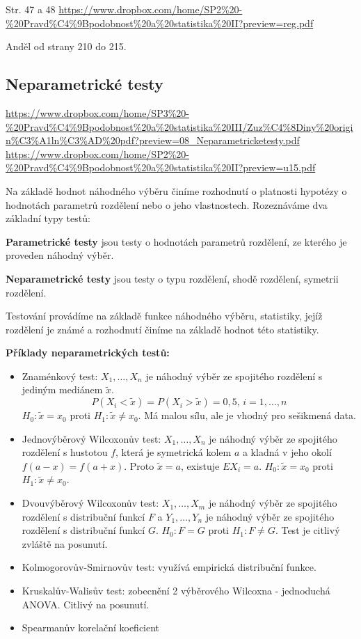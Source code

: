 \documentclass[a4]{report}
\theoremstyle{definition}
\begin{document}
{Str. 47 a 48
\url{https://www.dropbox.com/home/SP2\%20-\%20Pravd\%C4\%9Bpodobnost\%20a\%20statistika\%20II?preview=reg.pdf}

Anděl od strany 210 do 215. 

\subsection{Neparametrické testy}
\url{https://www.dropbox.com/home/SP3\%20-\%20Pravd\%C4\%9Bpodobnost\%20a\%20statistika\%20III/Zuz\%C4\%8Diny\%20origin\%C3\%A1ln\%C3\%AD\%20pdf?preview=08_Neparametricketesty.pdf}
\url{https://www.dropbox.com/home/SP2\%20-\%20Pravd\%C4\%9Bpodobnost\%20a\%20statistika\%20II?preview=u15.pdf}

Na základě hodnot náhodného výběru činíme rozhodnutí o platnosti hypotézy o hodnotách parametrů rozdělení nebo o jeho vlastnostech. Rozeznáváme dva základní typy testů:

\textbf{Parametrické testy} jsou testy o hodnotách parametrů rozdělení, ze kterého je proveden náhodný výběr.

\textbf{Neparametrické testy} jsou testy o typu rozdělení, shodě rozdělení, symetrii rozdělení.

Testování provádíme na základě funkce náhodného výběru, statistiky, jejíž rozdělení je známé a rozhodnutí činíme na základě hodnot této statistiky.

\textbf{Příklady neparametrických testů:} \begin{itemize}
\item Znaménkový test: $X_1,\ldots,X_n$ je náhodný výběr ze spojitého rozdělení s jediným mediánem $\tilde{x}$. $$P\left(X_i < \tilde{x} \right) = P\left(X_i > \tilde{x} \right) = 0,5,\, i=1,\ldots, n$$ $H_0: \tilde{x} = x_0$ proti $H_1: \tilde{x} \neq x_0$. Má malou sílu, ale je vhodný pro sešikmená data. 
\item Jednovýběrový Wilcoxonův test: $X_1,\ldots,X_n$ je náhodný výběr ze spojitého rozdělení s hustotou $f$, která je symetrická kolem $a$ a kladná v jeho okolí $f\left(a-x\right)=f\left(a+x\right)$. Proto $\tilde{x}=a$, existuje $EX_i = a$. $H_0: \tilde{x} = x_0$ proti $H_1: \tilde{x} \neq x_0$. 
\item Dvouvýběrový Wilcoxonův test: $X_1,\ldots,X_m$ je náhodný výběr ze spojitého rozdělení s distribuční funkcí $F$ a $Y_1,\ldots,Y_n$ je náhodný výběr ze spojitého rozdělení s distribuční funkcí $G$. $H_0: F = G$ proti $H_1: F \neq G$. Test je citlivý zvláště na posunutí.
\item Kolmogorovův-Smirnovův test: využívá empirická distribuční funkce. 
\item Kruskalův-Walisův test: zobecnění 2 výběrového Wilcoxna - jednoduchá ANOVA. Citlivý na posunutí.
\item Spearmanův korelační koeficient
\end{itemize}
}
\end{document}
